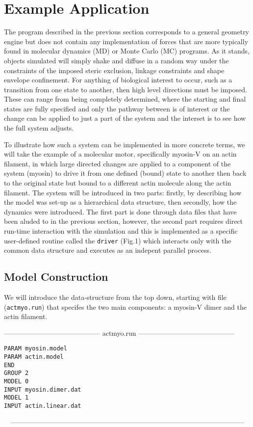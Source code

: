 \section{Example Application}

The program described in the previous section corresponds to a general
geometry engine but does not contain any implementation of forces that
are more typically found in molecular dynamics (MD) or Monte Carlo (MC)
programs.  As it stands, objects simulated will simply shake and diffuse
in a random way under the constraints of the imposed steric exclusion,
linkage constraints and shape envelope confinement.  For anything of
biological interest to occur,  such as a transition from one state to
another, then high level directions must be imposed.   These can range
from being completely determined, where the starting and final states
are fully specified and only the pathway between is of interest or
the change can be applied to just a part of the system and the interset
is to see how the full system adjusts.

To illustrate how such a system can be implemented in more concrete
terms, we will take the example of a molecular motor, specifically
myosin-V on an actin filament, in which large directed changes are
applied to a component of the system (myosin)  to drive it from one
defined (bound) state to another then back to the original state but
bound to a different actin molecule along the actin filament.  The 
system will be introduced in two parts: firstly, by describing how the
model was set-up as a hierarchical data structure, then secondly, how
the dynamics were introduced.   The first part is done through data
files that have been aluded to in the previous section, however, the
second part requires direct run-time interaction with the simulation
and this is implemented as a specific user-defined routine called
the {\tt driver} (Fig.1) which interacts only with the common data
structure and executes as an indepent parallel process.

\subsection{Model Construction}

We will introduce the data-structure from the top down, starting 
with file ({\tt actmyo.run}) that specifes the two main components:
a myosin-V dimer and the actin filament.
\begin{singlespace}
------------------------------------------
actmyo.run
------------------------------------------
\begin{verbatim}
PARAM myosin.model
PARAM actin.model
END
GROUP 2
MODEL 0
INPUT myosin.dimer.dat
MODEL 1
INPUT actin.linear.dat
\end{verbatim}
\ \ ------------------------------------------------------------------------------------------------------
\end{singlespace}


